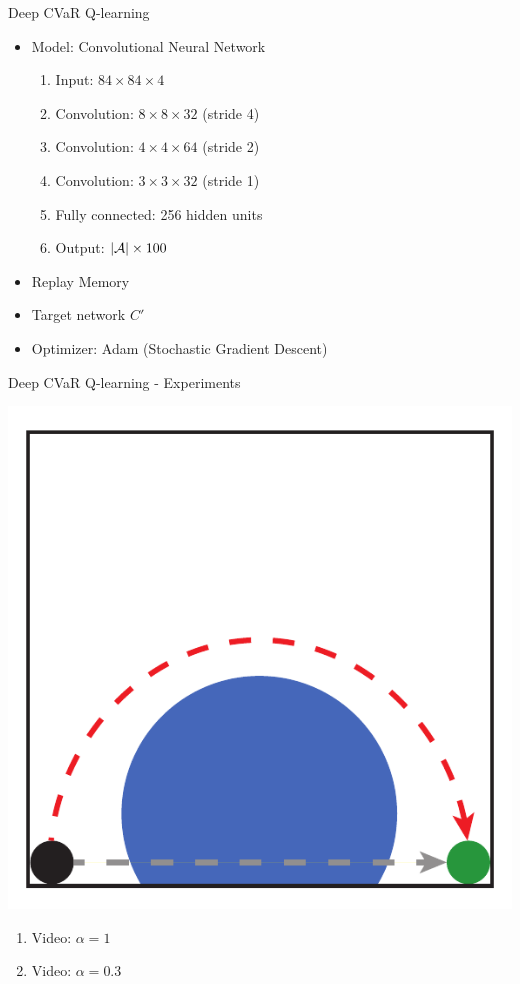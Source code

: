 \documentclass{beamer}
\begin{document}
\begin{frame}{Deep CVaR Q-learning}
\begin{itemize}
\item Model: Convolutional Neural Network
\begin{enumerate}
\item Input: $84\times84\times4$
\item Convolution: $8\times8\times32$ (stride 4)
\item Convolution: $4\times4\times64$ (stride 2)
\item Convolution: $3\times3\times32$ (stride 1)
\item Fully connected: 256 hidden units
\item Output: $|\mathcal{A}|\times100$
\end{enumerate}
\item Replay Memory
\item Target network $C'$
\item Optimizer: Adam (Stochastic Gradient Descent)
\end{itemize}
\end{frame}


\begin{frame}{Deep CVaR Q-learning - Experiments}

\center
\includegraphics[width=0.4\linewidth]{../gfx/icelake_full.pdf}

\begin{enumerate}
\item Video: $\alpha=1$
\item Video: $\alpha=0.3$
\end{enumerate}
\end{frame}

\end{document}
